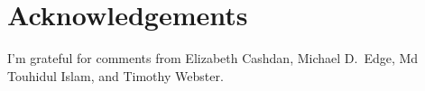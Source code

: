 \documentclass[11pt]{article}
\begin{document}
\section*{Acknowledgements}

I'm grateful for comments from Elizabeth Cashdan, Michael D.\ Edge,
Md Touhidul Islam, and Timothy Webster.

\printbibliography
\end{document}
